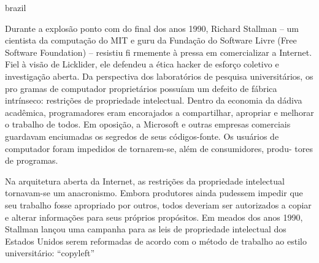 \begin{otherlanguage*}{brazil}
\begin{citacao}
Durante a explosão ponto com do final dos anos 1990, Richard Stallman – um cientista da computação do MIT e guru da Fundação do Software Livre (Free Software Foundation) – resistiu fi rmemente à pressa em comercializar a Internet. Fiel à visão de Licklider, ele defendeu a ética hacker de esforço coletivo e investigação aberta. Da perspectiva dos laboratórios de pesquisa universitários, os pro gramas de computador proprietários possuíam um defeito de fábrica intrínseco: restrições de propriedade intelectual. Dentro da economia da dádiva acadêmica, programadores eram encorajados a compartilhar, apropriar e melhorar o trabalho de todos. Em oposição, a Microsoft e outras empresas comerciais guardavam enciumadas os segredos de seus códigos-fonte. Os usuários de computador foram impedidos de tornarem-se, além de consumidores, produ- tores de programas.\cite[367]{Barbrook2009}
\end{citacao}


\begin{citacao}
Na arquitetura aberta da
Internet, as restrições da propriedade intelectual tornavam-se um anacronismo. Embora produtores ainda pudessem impedir que seu trabalho fosse apropriado por outros, todos deveriam ser autorizados a copiar e alterar informações para seus próprios propósitos. Em meados dos anos 1990, Stallman lançou uma campanha para as leis de propriedade intelectual dos Estados Unidos serem reformadas de acordo com o método de trabalho ao estilo universitário: “copyleft” \cite[368]{Barbrook2009}
\end{citacao}




\end{otherlanguage*}
